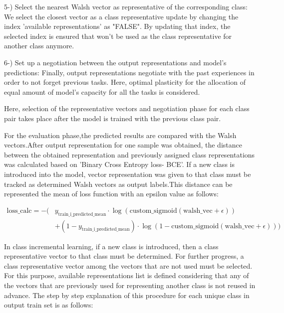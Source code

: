 \documentclass{article}
\begin{document}
5-) Select the nearest Walsh vector as representative of the corresponding class: We select the closest vector as a class representative update by changing the index 'available representations' as "FALSE".  By updating that index, the selected index is ensured that won't be used as the class representative for another class anymore.  


6-) Set up a negotiation between the output representations and model's predictions: Finally, output representations negotiate with the past experiences in order to not forget previous tasks. Here, optimal plasticity for the allocation of equal amount of model's capacity for all the tasks is considered. 

Here, selection of the representative vectors and negotiation phase for each class pair takes place after the model is trained with the previous class pair.

For the evaluation phase,the predicted results are compared with the Walsh vectors.After output representation
for one sample was obtained, the distance between the obtained representation and previously assigned class representations was calculated based on 'Binary Cross Entropy loss- BCE'. If a new class is introduced into the model, vector representation was given to that class must be tracked as determined Walsh vectors as output labels.This distance can be represented the mean of loss function with an epsilon value as follows:



\begin{equation}
\begin{aligned}
    \text{loss\_calc} = - \Bigg(&y_{\text{train\_i\_predicted\_mean}} \cdot \log\left(\text{custom\_sigmoid}(\text{walsh\_vec} + \epsilon)\right) \\
    &+ (1 -y_ {\text{train\_i\_predicted\_mean}}) \cdot \log\left(1 - \text{custom\_sigmoid}(\text{walsh\_vec} + \epsilon)\right)\Bigg)
\end{aligned}
\end{equation}



In class incremental learning, if a new class is introduced, then a class representative vector to that class must be determined. For further progress, a class representative vector among the vectors that are not used must be selected.  For this purpose, available representations list is defined considering that any of the vectors that are previously used for representing another class is not reused in advance.  The step by step explanation of this procedure for each unique class in output train set is as follows: 
\end{document}
